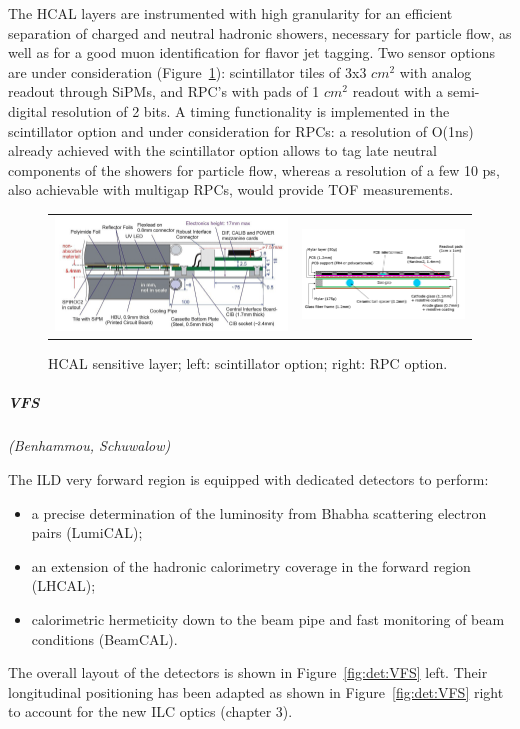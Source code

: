 The HCAL layers are instrumented with high granularity for an efficient separation of charged and neutral hadronic showers, necessary for particle flow, as well as for a good muon identification for flavor jet tagging. Two sensor options are under consideration (Figure~\ref{fig:det:HCAL_readout}): scintillator tiles of 3x3 $cm^2$ with analog readout through SiPMs, and RPC's with pads of 1 $cm^2$ readout with a semi-digital resolution of 2 bits. A timing functionality is implemented in the scintillator option and under consideration for RPCs: a resolution of O(1ns) already achieved with the scintillator option allows to tag late neutral components of the showers for particle flow, whereas a resolution of a few 10 ps, also achievable with multigap RPCs, would provide TOF measurements. 

\begin{figure}[t!]
\begin{tabular}{cc}
\includegraphics[width=0.5\hsize,viewport={0 -10 600 500},clip]{Detector/fig/AHCAL_layer.png} &
\includegraphics[width=0.5\hsize]{Detector/fig/SDHCAL_layer.png}
\end{tabular}
\caption{HCAL sensitive layer; left: scintillator option; right: RPC option.}
\label{fig:det:HCAL_readout}
\end{figure}


\vspace{1cm}
\subparagraph*{\bf VFS}
\textit{(Benhammou, Schuwalow)}

The ILD very forward region is equipped with dedicated detectors to perform:
\begin{itemize}
\item a precise determination of the luminosity from Bhabha scattering electron pairs (LumiCAL);
\item an extension of the hadronic calorimetry coverage in the forward region (LHCAL);
\item calorimetric hermeticity down to the beam pipe and fast monitoring of beam conditions (BeamCAL).
\end{itemize}
The overall layout of the detectors is shown in Figure~\ref{fig:det:VFS} left. Their longitudinal positioning has been adapted as shown in Figure~\ref{fig:det:VFS} right to account for the new ILC optics (chapter 3).  

